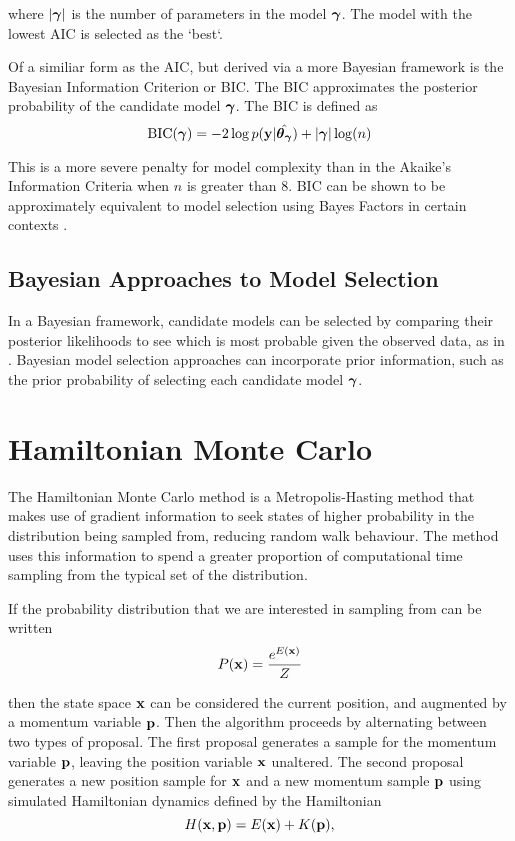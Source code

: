 \documentclass{amsart}[12pt]
\begin{document}
where $|{\boldsymbol \gamma}|$ is the number of parameters in the model ${\boldsymbol \gamma}$. The model with the lowest AIC is selected
as the `best`.

Of a similiar form as the AIC, but derived via a more Bayesian framework is the Bayesian Information Criterion
or BIC. The BIC approximates the posterior probability of the candidate model ${\boldsymbol \gamma}$. The BIC is defined as
\[
	\text{BIC}({\boldsymbol \gamma}) = -2 \log p({\bf y} | \hat{{\boldsymbol \theta}_{\boldsymbol \gamma}}) + |{\boldsymbol \gamma}| \log(n)
\]

This is a more severe penalty for model complexity than in the Akaike's Information Criteria when $n$ is
greater than $8$. BIC can be shown to be approximately equivalent to model selection using Bayes Factors
in certain contexts \cite{Kass1993}.

\subsection{Bayesian Approaches to Model Selection}
In a Bayesian framework, candidate models can be selected by comparing their posterior likelihoods to see
which is most probable given the observed data, as in \cite{Kass1993}. Bayesian model selection approaches
can incorporate prior information, such as the prior probability of selecting each candidate model ${\boldsymbol \gamma}$.

\section{Hamiltonian Monte Carlo}
\cite{MacKay:2002:ITI:971143}
\cite{Betancourt2017}
The Hamiltonian Monte Carlo method is a Metropolis-Hasting method that makes use of gradient information to
seek states of higher probability in the distribution being sampled from, reducing random walk behaviour. The method uses this information to spend a greater proportion of computational time sampling from the typical set of 
the distribution.

If the probability distribution that we are interested in sampling from can be written
\[
	P({\bf x}) = \frac{e^{E({\bf x})}}{Z}
\]

then the state space ${\bf x}$ can be considered the current position, and augmented by a momentum variable
${\bf p}$. Then the algorithm proceeds by alternating between two types of proposal. The first proposal generates
a sample for the momentum variable ${\bf p}$, leaving the position variable ${\bf x}$ unaltered. The second proposal
generates a new position sample for ${\bf x}$ and a new momentum sample ${\bf p}$ using simulated Hamiltonian dynamics
defined by the Hamiltonian
\[
	H({\bf x}, {\bf p}) = E({\bf x}) + K({\bf p}),
\]
\end{document}
